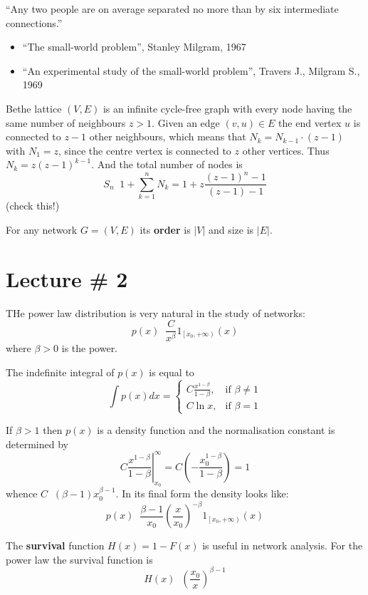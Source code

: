 \documentclass[a4paper]{article}
\newcommand{\clop}[1]{{\left [ #1 \right )}}
\newcommand{\brac}[1]{{\left ( #1 \right )}}
\newcommand{\induc}[1]{{\left . #1 \right \vert}}
\newcommand{\abs}[1]{{\left | #1 \right |}}
\newcommand{\defn}{\mathop{\overset{\Delta}{=}}\nolimits}
\begin{document}
``Any two people are on average separated no more than by six intermediate connections.''
\begin{itemize}
\item ``The small-world problem'', Stanley Milgram, 1967
\item ``An experimental study of the small-world problem'', Travers J., Milgram S., 1969
\end{itemize}

Bethe lattice $(V,E)$ is an infinite cycle-free graph with every node having the same number of neighbours $z > 1$.
Given an edge $(v,u)\in E$ the end vertex $u$ is connected to $z-1$ other neighbours, which means that $N_k = N_{k-1}\cdot (z-1)$ with $N_1 = z$, since the centre vertex is connected to $z$ other vertices.
Thus $N_k = z \brac{z-1}^{k-1}$.
And the total number of nodes is \[S_n \defn 1+\sum_{k = 1}^n N_k = 1 + z \frac{\brac{z-1}^n-1}{(z-1)-1}\] (check this!)

For any network $G=(V,E)$ its \textbf{order} is $\abs{V}$ and size is $\abs{E}$.



\section{Lecture \# 2} %
\label{sec:lecture_2}

THe power law distribution is very natural in the study of networks:
\[p(x) \defn \frac{C}{x^\beta} 1_{\clop{x_0,+\infty}}(x)\]
where $\beta > 0$ is the power.

The indefinite integral of $p(x)$ is equal to
\[\int p(x) dx = \begin{cases}
    C \frac{x^{1-\beta}}{1-\beta},& \text{if } \beta\neq 1\\
    C \ln x, & \text{if } \beta = 1
\end{cases}\]

If $\beta > 1$ then $p(x)$ is a density function and the normalisation constant is determined by
\[\induc{C \frac{x^{1-\beta}}{1-\beta}}^\infty_{x_0} = C \brac{ - \frac{x_0^{1-\beta}}{1-\beta}} = 1\]
whence $C\defn (\beta - 1) x_0^{\beta-1}$. In its final form the density looks like:
\[p(x) \defn \frac{\beta - 1}{x_0} \brac{\frac{x}{x_0}}^{-\beta} 1_{\clop{x_0,+\infty}}(x)\]

The \textbf{survival} function $H(x) = 1 - F(x)$ is useful in network analysis. For the power law the survival function is \[H(x) \defn \brac{\frac{x_0}{x}}^{\beta-1}\]
\end{document}
